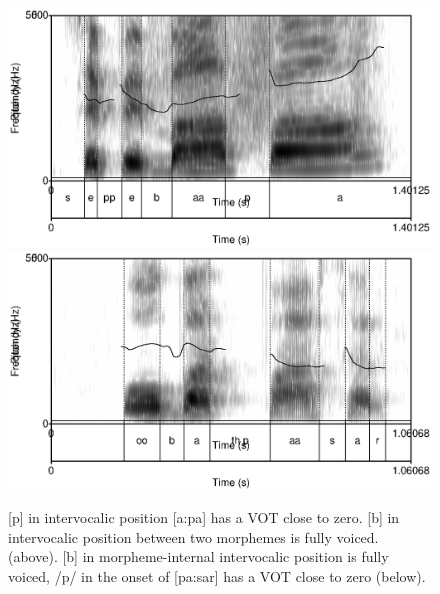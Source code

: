 \begin{figure}
 \centering
 \includegraphics[height=0.3\textheight]{./pics/seppebaapa.eps}
 \includegraphics[height=0.3\textheight]{./pics/oobathpaasar.eps}
 \caption{[p] in intervocalic position [a:pa] has a VOT close to zero. [b] in intervocalic position between two morphemes is fully voiced. (above). [b] in morpheme-internal intervocalic position is fully voiced, /p/ in the onset of [pa:sar] has a VOT close to zero (below).}
 \label{fig:phon:vot:oobathpaasar}
\end{figure}




